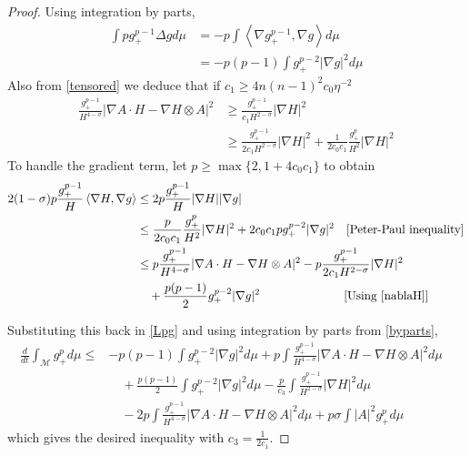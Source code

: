 \begin{proof}
    Using integration by parts, 
    \begin{align}
        \int pg_{+}^{p-1} \Delta g d \mu & = - p\int \left< \nabla g_{+}^{p-1}, \nabla g \right> d \mu \\
        & = -p(p-1) \int g_{+}^{p-2}| \nabla g|^{2} d \mu \label{byparts}
    \end{align}
    Also from \cref{tensored} we deduce that if $ c_{1} \ge 4 n(n-1)^{2}c_{0} \eta^{-2} $ 
    \begin{align}
        \frac{g_{+}^{p-1}}{H^{4-\sigma}}|\nabla A \cdot H - \nabla H \otimes A|^{2} &\ge \frac{g_{+}^{p-1}}{c_{1}H^{2-\sigma}}| \nabla H|^{2} \nonumber\\
        & \ge \frac{g_{+}^{p-1}}{2c_{1}H^{2-\sigma}}| \nabla H|^{2} + \frac{1}{2c_{0}c_{1}} \frac{g_{+}^{p}}{H^{2}}| \nabla H|^{2} \label{nablaH}
    \end{align}
    To handle the gradient term, let $ p \ge \max \{2,1+4c_{0}c_{1} \} $ to obtain \begin{align*}
        2(1-\sigma)p \frac{g_{+}^{p-1}}{H} \left< \nabla H, \nabla g \right> & \le 2p \frac{g_{+}^{p-1}}{H} |\nabla H| |\nabla g| \\
        & \le \frac{p}{2c_{0}c_{1}} \frac{g_{+}^{p}}{H^{2}}|\nabla H|^{2} + 2c_{0}c_{1}pg_{+}^{p-2}|\nabla g|^{2} \quad [\text{Peter-Paul inequality}] \\
        & \le p \frac{g_{+}^{p-1}}{H^{4-\sigma}}|\nabla A \cdot H - \nabla H \otimes A|^{2} - p \frac{g_{+}^{p-1}}{2c_{1}H^{2-\sigma}}|\nabla H|^{2} \\
        & \quad + \frac{p(p-1)}{2}g_{+}^{p-2}|\nabla g|^{2} \qquad \qquad\quad  \qquad[\text{Using \cref{nablaH}}]
    \end{align*}

    Substituting this back in \cref{Lpg} and using integration by parts from \cref{byparts}, \begin{align*}
        \frac{d}{dt} \int_{ \mathcal{M}} g_{+}^{p} d \mu \le & -p(p-1)\int g_{+}^{p-2}|\nabla g|^{2} d \mu + p \int \frac{g_{+}^{p-1}}{H^{4-\sigma}}|\nabla A \cdot H - \nabla H \otimes A|^{2}d \mu & \\
        & \quad + \frac{p(p-1)}{2}\int g_{+}^{p-2}|\nabla g|^{2}d \mu - \frac{p}{c_{3}} \int \frac{g_{+}^{p-1}}{H^{2-\sigma}}|\nabla H|^{2} d \mu \\
        & \quad - 2p \int \frac{g_{+}^{p-1}}{H^{4-\sigma}}|\nabla A \cdot H - \nabla H \otimes A|^{2}d \mu + p \sigma \int |A|^{2}g_{+}^{p}d \mu
    \end{align*}
    which gives the desired inequality with $ c_{3} = \frac{1}{2c_{1}} $.
\end{proof}
